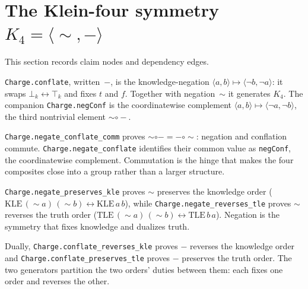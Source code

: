 \section{The Klein-four symmetry $K_4 = \langle{\sim},{-}\rangle$}

This section records claim nodes and dependency edges.

\begin{proposition}\label{thm:conflate}\leanok{}
\texttt{Charge.conflate}, written~$-$, is the knowledge-negation $\langle a, b\rangle \mapsto \langle \neg b, \neg a\rangle$: it swaps $\bot_k \leftrightarrow \top_k$ and fixes $t$ and $f$. Together with negation~$\sim$ it generates $K_4$. The companion \texttt{Charge.negConf} is the coordinatewise complement $\langle a, b\rangle \mapsto \langle \neg a, \neg b\rangle$, the third nontrivial element ${\sim}\circ{-}$.
\end{proposition}
\begin{theorem}\label{thm:negate-conflate-comm}\leanok{}
\texttt{Charge.negate\_conflate\_comm} proves ${\sim}\circ{-} = {-}\circ{\sim}$: negation and conflation commute. \texttt{Charge.negate\_conflate} identifies their common value as \texttt{negConf}, the coordinatewise complement. Commutation is the hinge that makes the four composites close into a group rather than a larger structure.
\end{theorem}
\begin{theorem}\label{thm:negate-orders}\leanok{}
\texttt{Charge.negate\_preserves\_kle} proves $\sim$ preserves the knowledge order ($\mathrm{KLE}\,({\sim}a)\,({\sim}b) \leftrightarrow \mathrm{KLE}\,a\,b$), while \texttt{Charge.negate\_reverses\_tle} proves $\sim$ reverses the truth order ($\mathrm{TLE}\,({\sim}a)\,({\sim}b) \leftrightarrow \mathrm{TLE}\,b\,a$). Negation is the symmetry that fixes knowledge and dualizes truth.
\end{theorem}
\begin{theorem}\label{thm:conflate-orders}\leanok{}
Dually, \texttt{Charge.conflate\_reverses\_kle} proves $-$ reverses the knowledge order and \texttt{Charge.conflate\_preserves\_tle} proves $-$ preserves the truth order. The two generators partition the two orders' duties between them: each fixes one order and reverses the other.
\end{theorem}
